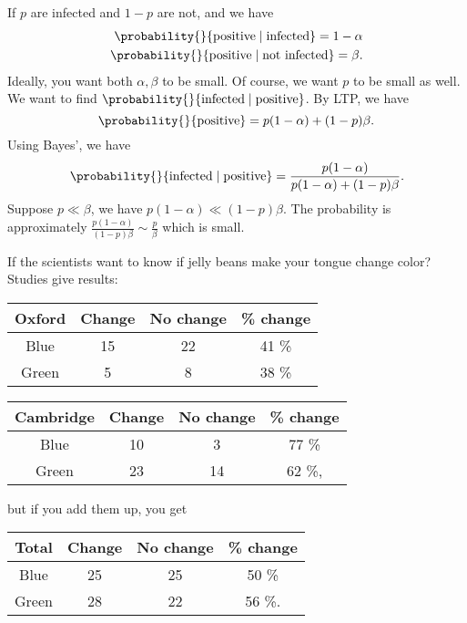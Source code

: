 \begin{example}
    If \(p\) are infected and \(1-p\) are not, and we have
    \begin{align*}
        \probability{}{\text{positive}\mid \text{infected}} = 1 - \alpha\\ 
        \probability{}{\text{positive}\mid \text{not infected}} = \beta.
    \end{align*}
    Ideally, you want both \(\alpha, \beta\) to be small. Of course, we want \(p\) to be small as well. We want to find \( \probability{}{\text{infected}\mid \text{positive}}\). By LTP, we have
    \[
        \probability{}{\text{positive}} = p(1-\alpha) + (1-p)\beta.
    \]
    Using Bayes', we have
    \[
        \probability{}{\text{infected}\mid \text{positive}} = \frac{p(1-\alpha)}{p(1-\alpha)+(1-p)\beta}.
    \]
    Suppose \(p \ll \beta\), we have \(p(1-\alpha)\ll (1-p)\beta\). The probability is approximately \(\frac{p(1-\alpha)}{(1-p)\beta} \sim \frac{p}{\beta}\) which is small.
\end{example}
\begin{example}
    If the scientists want to know if jelly beans make your tongue change color? Studies give results:
    \begin{center}
    \begin{tabular}{c|c|c|c}
        Oxford & Change & No change & \% change\\
        \hline
        Blue & 15 & 22 & 41 \% \\
        Green & 5 & 8 & 38 \%
    \end{tabular}
    \end{center}
    \begin{center}
    \begin{tabular}{c|c|c|c}
        Cambridge & Change & No change & \% change\\
        \hline
        Blue & 10 & 3 & 77 \% \\
        Green & 23 & 14 & 62 \%,
    \end{tabular}
    \end{center}
    but if you add them up, you get
    \begin{center}
    \begin{tabular}{c|c|c|c}
        Total & Change & No change & \% change\\
        \hline
        Blue & 25 & 25 & 50 \% \\
        Green & 28 & 22 & 56 \%.
    \end{tabular}
    \end{center}
\end{example}